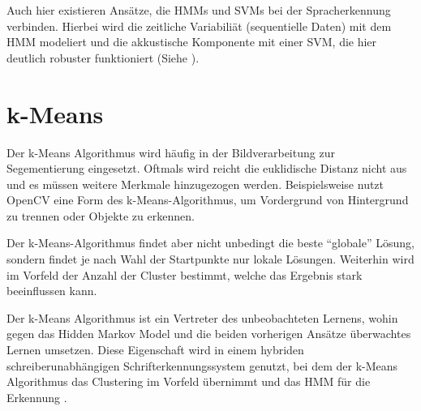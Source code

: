 Auch hier existieren Ansätze, die HMMs und SVMs bei der Spracherkennung verbinden. Hierbei wird die zeitliche Variabiliät (sequentielle Daten) mit dem HMM modeliert und die akkustische Komponente mit einer SVM, die hier deutlich robuster funktioniert (Siehe \cite{hmmsvm}).


\section{k-Means} \label{sec:kmeans}
Der k-Means Algorithmus wird häufig in der Bildverarbeitung zur Segementierung eingesetzt. Oftmals wird reicht die euklidische Distanz nicht aus und es müssen weitere Merkmale hinzugezogen werden. Beispielsweise nutzt OpenCV eine Form des k-Means-Algorithmus, um Vordergrund von Hintergrund zu trennen oder Objekte zu erkennen.

Der k-Means-Algorithmus findet aber nicht unbedingt die beste ``globale'' Lösung, sondern findet je nach Wahl der Startpunkte nur lokale Lösungen. Weiterhin wird im Vorfeld der Anzahl der Cluster bestimmt, welche das  Ergebnis stark beeinflussen kann.

Der k-Means Algorithmus ist ein Vertreter des unbeobachteten Lernens, wohin gegen das Hidden Markov Model und die beiden vorherigen Ansätze überwachtes Lernen umsetzen. Diese Eigenschaft wird in einem hybriden schreiberunabhängigen Schrifterkennungssystem genutzt, bei dem der k-Means Algorithmus das Clustering im Vorfeld übernimmt und das HMM für die Erkennung \cite{hmmkm}. 
